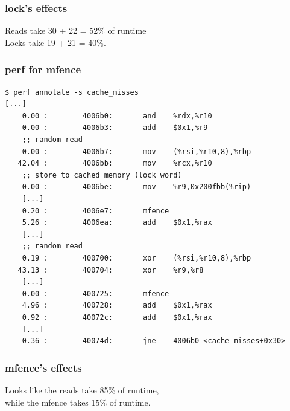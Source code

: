 \begin{frame}
  \frametitle{lock's effects}

  
    Reads take 30 + 22 = 52\% of runtime\\
    Locks take 19 + 21 = 40\%.
  

\end{frame}

\begin{frame}[fragile]
  \frametitle{perf for mfence}

  \begin{lstlisting}
$ perf annotate -s cache_misses
[...]
    0.00 :        4006b0:       and    %rdx,%r10
    0.00 :        4006b3:       add    $0x1,%r9
    ;; random read
    0.00 :        4006b7:       mov    (%rsi,%r10,8),%rbp
   42.04 :        4006bb:       mov    %rcx,%r10
    ;; store to cached memory (lock word)
    0.00 :        4006be:       mov    %r9,0x200fbb(%rip)
    [...]
    0.20 :        4006e7:       mfence 
    5.26 :        4006ea:       add    $0x1,%rax
    [...]
    ;; random read
    0.19 :        400700:       xor    (%rsi,%r10,8),%rbp
   43.13 :        400704:       xor    %r9,%r8
    [...]
    0.00 :        400725:       mfence 
    4.96 :        400728:       add    $0x1,%rax
    0.92 :        40072c:       add    $0x1,%rax
    [...]
    0.36 :        40074d:       jne    4006b0 <cache_misses+0x30>
  \end{lstlisting}

\end{frame}

\begin{frame}
  \frametitle{mfence's effects}

  
    Looks like the reads take 85\% of runtime,\\
    while the mfence takes 15\% of runtime.
  

\end{frame}

